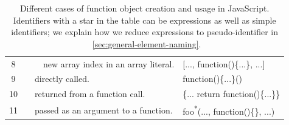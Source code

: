 \documentclass[10pt, preprint]{sigplanconf}
\begin{document}
\begin{table}
{\begin{tabular}{ | c | l | l | l | m{2.5cm} | l|}
	 8 &
	 & 
	 & \multicolumn{2}{|m{2.8cm}|}{
	   new array index in an array literal.} 
   & [..., function()\{...\}, ...] \\ 
   \cline{0-0}\cline{3-6} 

   9 &
   & \multicolumn{3}{|m{3.8cm}|}{
     \raggedright directly called.}
   & function()\{...\}() \\
   \cline{0-0}\cline{3-6} 

   10 &
   & \multicolumn{3}{|m{3.5cm}|}{
     \raggedright returned from a function call.}
   & \{... return function()\{...\}\} \\
   \cline{0-0}\cline{3-6} 

   11 &
   & \multicolumn{3}{|m{3.5cm}|}{
     \raggedright passed as an argument to a function.}
   & foo\textsuperscript{*}(..., function()\{\}, ...) \\
   \hline 

  \end{tabular}
  }
\caption{Different cases of function object creation and usage in JavaScript.  Identifiers with a star in the table can be expressions as well as simple identifiers; we explain how we reduce expressions to pseudo-identifier in ~\ref{sec:general-element-naming}.}
\label{table:function-types} 
\end{table}
\end{document}

